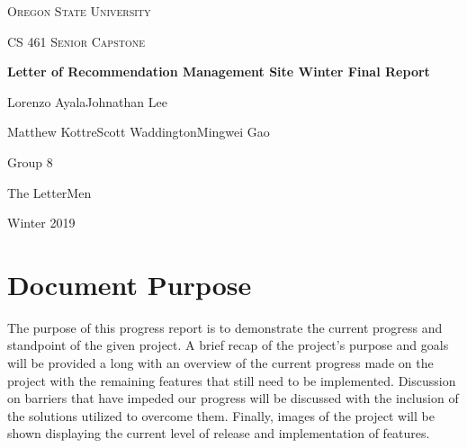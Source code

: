\documentclass[draftclsnofoot, onecolumn, letterpaper, 10pt]{IEEEtran}
\begin{document}
\begin{titlepage}
     \centering
     {\scshape\LARGE Oregon State University \par}
     \vspace{1cm}
     {\scshape\Large CS 461 Senior Capstone\par}
     \vspace{1.5cm}
     {\huge\bfseries Letter of Recommendation Management Site Winter Final Report\par}
     \vspace{2cm}
     {\Large Lorenzo Ayala\hspace{0.75cm}Johnathan Lee\par 
     Matthew Kottre\hspace{0.75cm}Scott Waddington\hspace{0.75cm}Mingwei Gao\par}
    \vfill

    \begin{abstract}
        This document provides an overview of the state of the project as of week 10 for the Winter Term 2019. Included is the purpose of this project, current progress, remaining implementation, and barriers and solutions that we have experienced throughout our ongoing development of this project.
    \end{abstract}

    \vfill

    {\large Group 8\par}
    {\large The LetterMen\par}
    {\large Winter 2019\par}
\end{titlepage}

\tableofcontents
\newpage

\section{Document Purpose}
The purpose of this progress report is to demonstrate the current progress and standpoint of the given project. A brief recap of the project's purpose and goals will be provided a long with an overview of the current progress made on the project with the remaining features that still need to be implemented. Discussion on barriers that have impeded our progress will be discussed with the inclusion of the solutions utilized to overcome them. Finally, images of the project will be shown displaying the current level of release and implementation of features.  
\end{document}

